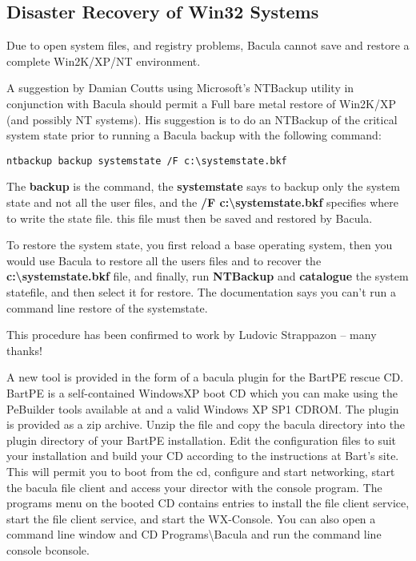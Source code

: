 \subsection*{Disaster Recovery of Win32 Systems}

Due to open system files, and registry problems, Bacula cannot save and
restore a complete Win2K/XP/NT environment. 

A suggestion by Damian Coutts using Microsoft's NTBackup utility in
conjunction with Bacula should permit a Full bare metal restore of Win2K/XP
(and possibly NT systems). His suggestion is to do an NTBackup of the critical
system state prior to running a Bacula backup with the following command: 

\footnotesize
\begin{verbatim}
ntbackup backup systemstate /F c:\systemstate.bkf
\end{verbatim}
\normalsize

The {\bf backup} is the command, the {\bf systemstate} says to backup only the
system state and not all the user files, and the {\bf /F
c:\textbackslash{}systemstate.bkf} specifies where to write the state file.
this file must then be saved and restored by Bacula. 

To restore the system state, you first reload a base operating system, then
you would use Bacula to restore all the users files and to recover the {\bf
c:\textbackslash{}systemstate.bkf} file, and finally, run {\bf NTBackup} and
{\bf catalogue} the system statefile, and then select it for restore. The
documentation says you can't run a command line restore of the systemstate. 

This procedure has been confirmed to work by Ludovic Strappazon -- many
thanks! 

A new tool is provided in the form of a bacula plugin for the BartPE rescue
CD. BartPE is a self-contained WindowsXP boot CD which you can make using the
PeBuilder tools available at 
 and a valid
Windows XP SP1 CDROM. The plugin is provided as a zip archive. Unzip the file
and copy the bacula directory into the plugin directory of your BartPE
installation. Edit the configuration files to suit your installation and build
your CD according to the instructions at Bart's site. This will permit you to
boot from the cd, configure and start networking, start the bacula file client
and access your director with the console program. The programs menu on the
booted CD contains entries to install the file client service, start the file
client service, and start the WX-Console. You can also open a command line
window and CD Programs\textbackslash{}Bacula and run the command line console
bconsole. 

